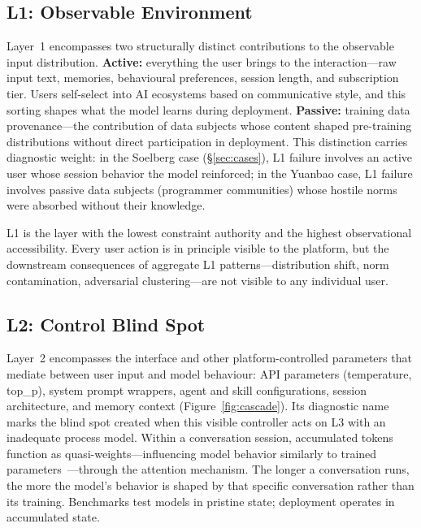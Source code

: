 \subsection{L1: Observable Environment}

Layer~1 encompasses two structurally distinct contributions to the observable input distribution. \textbf{Active:} everything the user brings to the interaction---raw input text, memories, behavioural preferences, session length, and subscription tier. Users self-select into AI ecosystems based on communicative style, and this sorting shapes what the model learns during deployment. \textbf{Passive:} training data provenance---the contribution of data subjects whose content shaped pre-training distributions without direct participation in deployment. This distinction carries diagnostic weight: in the Soelberg case (\S\ref{sec:cases}), L1 failure involves an active user whose session behavior the model reinforced; in the Yuanbao case, L1 failure involves passive data subjects (programmer communities) whose hostile norms were absorbed without their knowledge.

L1 is the layer with the lowest constraint authority and the highest observational accessibility. Every user action is in principle visible to the platform, but the downstream consequences of aggregate L1 patterns---distribution shift, norm contamination, adversarial clustering---are not visible to any individual user.

\subsection{L2: Control Blind Spot}

Layer~2 encompasses the interface and other platform-controlled parameters that mediate between user input and model behaviour: API parameters (temperature, top\_p), system prompt wrappers, agent and skill configurations, session architecture, and memory context (Figure~\ref{fig:cascade}). Its diagnostic name marks the blind spot created when this visible controller acts on L3 with an inadequate process model. Within a conversation session, accumulated tokens function as quasi-weights---influencing model behavior similarly to trained parameters~\cite{dai2023can, olsson2022context}---through the attention mechanism. The longer a conversation runs, the more the model's behavior is shaped by that specific conversation rather than its training. Benchmarks test models in pristine state; deployment operates in accumulated state.

